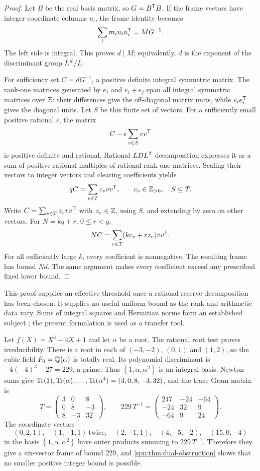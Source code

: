 \begin{proof}
Let $B$ be the real basis matrix, so $G=B^{\mathsf{T}}B$. If the frame vectors have
integer coordinate columns $u_i$, the frame identity becomes
\[
 \sum_im_iu_iu_i^{\mathsf{T}}=MG^{-1}.
\]
The left side is integral. This proves $d\mid M$; equivalently, $d$ is the
exponent of the discriminant group $L^\#/L$.

For sufficiency set $C=dG^{-1}$, a positive definite integral symmetric
matrix. The rank-one matrices generated by $e_i$ and $e_i+e_j$ span all
integral symmetric matrices over $\mathbb{Z}$: their differences give the
off-diagonal matrix units, while $e_ie_i^{\mathsf{T}}$ gives the diagonal units.
Let $S$ be this finite set of vectors. For a sufficiently small positive
rational $\epsilon$, the matrix
\[
 C-\epsilon\sum_{v\in S}vv^{\mathsf{T}}
\]
is positive definite and rational. Rational $LDL^{\mathsf{T}}$ decomposition
expresses it as a sum of positive rational multiples of rational rank-one
matrices. Scaling their vectors to integer vectors and clearing coefficients
yields
\[
 qC=\sum_{v\in T}c_vvv^{\mathsf{T}},\qquad c_v\in\mathbb{Z}_{>0},\quad S\subseteq T .
\]
Write $C=\sum_{v\in T}z_vvv^{\mathsf{T}}$ with $z_v\in\mathbb{Z}$, using $S$, and extending
by zero on other vectors. For $N=kq+r$, $0\le r<q$,
\[
 NC=\sum_{v\in T}(kc_v+rz_v)vv^{\mathsf{T}}.
\]
For all sufficiently large $k$, every coefficient is nonnegative. The
resulting frame has bound $Nd$. The same argument makes every coefficient
exceed any prescribed fixed lower bound.
\end{proof}

This proof supplies an effective threshold once a rational reserve
decomposition has been chosen. It supplies no useful uniform bound as the rank
and arithmetic data vary. Sums of integral squares and Hermitian norms form an
established subject \cite{Beli2019Waring}; the present formulation is used as a
transfer tool.

\begin{example}\label{spn:ex:cubic229}
Let $f(X)=X^3-4X+1$ and let $\alpha$ be a root. The rational root test proves
irreducibility. There is a root in each of $(-3,-2)$, $(0,1)$ and $(1,2)$, so
the cubic field $F_0=\mathbb{Q}(\alpha)$ is totally real. Its polynomial discriminant
is $-4(-4)^3-27=229$, a prime. Thus $(1,\alpha,\alpha^2)$ is an integral
basis. Newton sums give
$\operatorname{Tr}(1),\operatorname{Tr}(\alpha),\dots,\operatorname{Tr}(\alpha^4)=(3,0,8,-3,32)$, and the trace Gram
matrix is
\[
 T=\begin{pmatrix}3&0&8\\0&8&-3\\8&-3&32\end{pmatrix},\qquad
 229\,T^{-1}=\begin{pmatrix}247&-24&-64\\-24&32&9\\-64&9&24\end{pmatrix}.
\]
The coordinate vectors
\[
 (0,2,1),\quad(1,-1,1)\ \text{twice},\quad(2,-1,1),\quad(4,-5,-2),\quad
 (15,0,-4)
\]
in the basis $(1,\alpha,\alpha^2)$ have outer products summing to
$229\,T^{-1}$. Therefore they give a six-vector frame of bound $229$, and
\cref{spn:thm:dual-obstruction} shows that no smaller positive integer bound
is possible.
\end{example}

